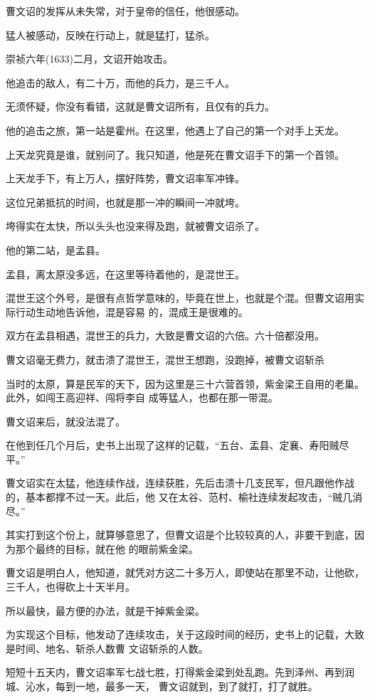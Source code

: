 \documentclass[11pt,a4paper,onecolumn]{article}
\begin{document}
曹文诏的发挥从未失常，对于皇帝的信任，他很感动。

猛人被感动，反映在行动上，就是猛打，猛杀。

崇祯六年(1633)二月，文诏开始攻击。

他追击的敌人，有二十万，而他的兵力，是三千人。

无须怀疑，你没有看错，这就是曹文诏所有，且仅有的兵力。

他的追击之旅，第一站是霍州。在这里，他遇上了自己的第一个对手\myrule 上天龙。

上天龙究竟是谁，就别问了。我只知道，他是死在曹文诏手下的第一个首领。

上天龙手下，有上万人，摆好阵势，曹文诏率军冲锋。

这位兄弟抵抗的时间，也就是那一冲的瞬间\myrule 一冲就垮。

垮得实在太快，所以头头也没来得及跑，就被曹文诏杀了。

他的第二站，是孟县。

孟县，离太原没多远，在这里等待着他的，是混世王。

混世王这个外号，是很有点哲学意味的，毕竟在世上，也就是个混。但曹文诏用实际行动生动地告诉他，混是容易
的，混成王是很难的。

双方在孟县相遇，混世王的兵力，大致是曹文诏的六倍。六十倍都没用。

曹文诏毫无费力，就击溃了混世王，混世王想跑，没跑掉，被曹文诏斩杀

当时的太原，算是民军的天下，因为这里是三十六营首领，紫金梁王自用的老巢。此外，如闯王高迎祥、闯将李自
成等猛人，也都在那一带混。

曹文诏来后，就没法混了。

在他到任几个月后，史书上出现了这样的记载，``五台、盂县、定襄、寿阳贼尽平。''

曹文诏实在太猛，他连续作战，连续获胜，先后击溃十几支民军，但凡跟他作战的，基本都撑不过一天。此后，他
又在太谷、范村、榆社连续发起攻击，``贼几消尽。''

其实打到这个份上，就算够意思了，但曹文诏是个比较较真的人，非要干到底，因为那个最终的目标，就在他
的眼前\myrule 紫金梁。

曹文诏是明白人，他知道，就凭对方这二十多万人，即使站在那里不动，让他砍，三千人，也得砍上十天半月。

所以最快，最方便的办法，就是干掉紫金梁。

为实现这个目标，他发动了连续攻击，关于这段时间的经历，史书上的记载，大致是时间、地名、斩杀人数\myrule 曹
文诏斩杀的人数。

短短十五天内，曹文诏率军七战七胜，打得紫金梁到处乱跑。先到泽州、再到润城、沁水，每到一地，最多一天，
曹文诏就到，到了就打，打了就胜。
\end{document}
